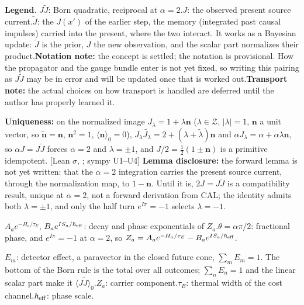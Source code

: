 \documentclass[10pt]{article}
\newcommand{\rv}[1]{\widetilde{#1}}
\newcommand{\gr}[2]{\langle #1\rangle_{#2}}
\newcommand{\Zc}{\mathcal Z}
\newcommand{\lean}[1]{\texttt{\detokenize{#1}}}
\newcommand{\tg}[1]{{\scriptsize[#1]}}
\begin{document}
\vspace{1pt}
\begin{smallbox}
\textbf{Legend}. $J\rv J$: Born quadratic, reciprocal at $\alpha=2$.\quad $J$: the observed present source current.\quad $\rv J$: the $J(x')$ of the earlier step, the memory (integrated past causal impulses) carried into the present, where the two interact. It works as a Bayesian update: $\rv J$ is the prior, $J$ the new observation, and the scalar part normalizes their product.\quad \textbf{Notation note:} the concept is settled; the notation is provisional. How the propagator and the gauge bundle enter is not yet fixed, so writing this pairing as $J\rv J$ may be in error and will be updated once that is worked out.\quad \textbf{Transport note:} the actual choices on how transport is handled are deferred until the author has properly learned it.\par\vspace{1pt}
\textbf{Uniqueness:} on the normalized image $J_\lambda=1+\lambda\mathbf n$ ($\lambda\in\Zc$, $|\lambda|=1$, $\mathbf n$ a unit vector, so $\rv{\mathbf n}=\mathbf n$, $\mathbf n^2=1$, $\gr{\mathbf n}0=0$), $J_\lambda\rv{J_\lambda}=2+(\lambda+\rv\lambda)\mathbf n$ and $\alpha J_\lambda=\alpha+\alpha\lambda\mathbf n$, so $\alpha J=J\rv J$ forces $\alpha=2$ and $\lambda=\pm1$, and $J/2=\tfrac12(1\pm\mathbf n)$ is a primitive idempotent. \tg{Lean \lean{uniq_alpha_dot}$\sigma$, \lean{uniq_projector}; sympy U1--U4} \textbf{Lemma disclosure:} the forward lemma is not yet written: that the $\alpha=2$ integration carries the present source current, through the normalization map, to $1-\mathbf n$. Until it is, $2J=J\rv J$ is a compatibility result, unique at $\alpha=2$, not a forward derivation from CAL; the identity admits both $\lambda=\pm1$, and only the half turn $e^{I\pi}=-1$ selects $\lambda=-1$.\par\vspace{1pt}
$A_ae^{-H_a/\tau_E}$, $B_ae^{IS_a/\hbar_{\rm eff}}$: decay and phase exponentials of $Z_a$.\quad $\theta=\alpha\pi/2$: fractional phase, and $e^{I\pi}=-1$ at $\alpha=2$, so $Z_a=A_ae^{-H_a/\tau_E}-B_ae^{IS_a/\hbar_{\rm eff}}$.\par\vspace{1pt}
$E_m$: detector effect, a paravector in the closed future cone, $\sum_mE_m=1$. The bottom of the Born rule is the total over all outcomes; $\sum_nE_n=1$ and the linear scalar part make it $\gr{J\rv J}0$.\quad $Z_a$: carrier component.\quad $\tau_E$: thermal width of the cost channel.\quad $\hbar_{\rm eff}$: phase scale.
\end{smallbox}
\end{document}
